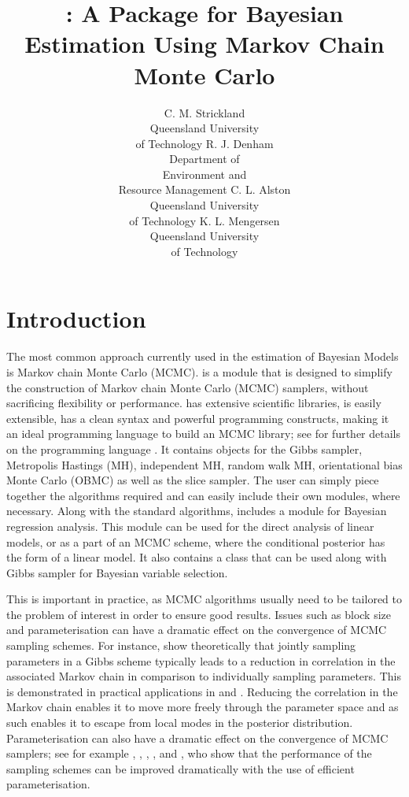 \documentclass[article]{jss}
\author{C. M. Strickland\\Queensland University\\ of Technology \And 
        R. J. Denham\\Department of \\Environment and\\ Resource Management \And
        C. L. Alston\\Queensland University\\ of Technology \And 
        K. L. Mengersen\\Queensland University\\ of Technology}
\title{\pkg{PyMCMC}: A \proglang{Python} Package for Bayesian Estimation 
  Using Markov Chain Monte Carlo}
\begin{document}
\section{Introduction}

The most common approach currently used in the estimation of Bayesian
Models is Markov chain Monte Carlo (MCMC).  is a
 module that is designed to simplify the construction
of Markov chain Monte Carlo (MCMC) samplers, without sacrificing
flexibility or performance.  has extensive scientific
libraries, is easily extensible, has a clean syntax and powerful
programming constructs, making it an ideal programming language to
build an MCMC library; see \citet{Python} for further details on the
programming language . It contains objects for the
Gibbs sampler, Metropolis Hastings (MH), independent MH, random walk
MH, orientational bias Monte Carlo (OBMC) as well as the slice
sampler. The user can simply piece together the algorithms required
and can easily include their own modules, where necessary. Along with
the standard algorithms,  includes a module for Bayesian
regression analysis. This module can be used for the direct analysis
of linear models, or as a part of an MCMC scheme, where the
conditional posterior has the form of a linear model.  It also
contains a class that can be used along with Gibbs sampler for
Bayesian variable selection.

This is important in practice, as MCMC algorithms usually need to
be tailored to the problem of interest in order to ensure good results.
Issues such as block size and parameterisation can have a dramatic
effect on the convergence of MCMC sampling schemes. For instance,
\citet{LuiKongWong1994} show theoretically that jointly sampling
parameters in a Gibbs scheme typically leads to a reduction in correlation
in the associated Markov chain in comparison to individually sampling
parameters. This is demonstrated in practical applications in \citet{CarterKohn1994}
and \citet{KimShephardChib1998}. Reducing the correlation in the
Markov chain enables it to move more freely through the parameter
space and as such enables it to escape from local modes in the posterior
distribution. Parameterisation can also have a dramatic effect on
the convergence of MCMC samplers; see for example \citet{GelfandSahuCarlin1995},
\citet{RobersSahu1997}, \citet{PittShepard1999}, \citet{RobertMengersen1999},
\citet{FruwirthSchnatter2004} and \citet{StricklandMartinForbes2008},
who show that the performance of the sampling schemes can be improved
dramatically with the use of efficient parameterisation.
\end{document}
